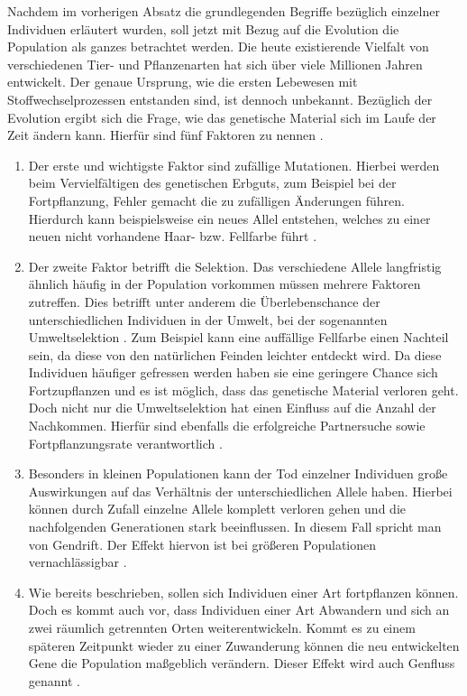 Nachdem im vorherigen Absatz die grundlegenden Begriffe bezüglich einzelner Individuen erläutert wurden, soll jetzt mit Bezug auf die Evolution die Population als ganzes betrachtet werden. Die heute existierende Vielfalt von verschiedenen Tier- und Pflanzenarten hat sich über viele Millionen Jahren entwickelt. Der genaue Ursprung, wie die ersten Lebewesen mit Stoffwechselprozessen entstanden sind, ist dennoch unbekannt. Bezüglich der Evolution ergibt sich die Frage, wie das genetische Material sich im Laufe der Zeit ändern kann. Hierfür sind fünf Faktoren zu nennen \cite{weicker2015evolutionare}.
\begin{enumerate}
	\item Der erste und wichtigste Faktor sind zufällige Mutationen. Hierbei werden beim Vervielfältigen des genetischen Erbguts, zum Beispiel bei der Fortpflanzung, Fehler gemacht die zu zufälligen Änderungen führen. Hierdurch kann beispielsweise ein neues Allel entstehen, welches zu einer neuen nicht vorhandene Haar- bzw. Fellfarbe führt \cite{weicker2015evolutionare}. 
	
	\item Der zweite Faktor betrifft die Selektion. Das verschiedene Allele langfristig ähnlich häufig in der Population vorkommen müssen mehrere Faktoren zutreffen. Dies betrifft unter anderem die Überlebenschance der unterschiedlichen Individuen in der Umwelt, bei der sogenannten Umweltselektion \cite{weicker2015evolutionare}. Zum Beispiel kann eine auffällige Fellfarbe einen Nachteil sein, da diese von den natürlichen Feinden leichter entdeckt wird. Da diese Individuen häufiger gefressen werden haben sie eine geringere Chance sich Fortzupflanzen und es ist möglich, dass das genetische Material verloren geht. Doch nicht nur die Umweltselektion hat einen Einfluss auf die Anzahl der Nachkommen. Hierfür sind ebenfalls die erfolgreiche Partnersuche sowie Fortpflanzungsrate verantwortlich \cite{weicker2015evolutionare}.
	
	\item Besonders in kleinen Populationen kann der Tod einzelner Individuen große Auswirkungen auf das Verhältnis der unterschiedlichen Allele haben. Hierbei können durch Zufall einzelne Allele komplett verloren gehen und die nachfolgenden Generationen stark beeinflussen. In diesem Fall spricht man von Gendrift. Der Effekt hiervon ist bei größeren Populationen vernachlässigbar \cite{weicker2015evolutionare}.
	
	\item Wie bereits beschrieben, sollen sich Individuen einer Art fortpflanzen können. Doch es kommt auch vor, dass Individuen einer Art Abwandern und sich an zwei räumlich getrennten Orten weiterentwickeln. Kommt es zu einem späteren Zeitpunkt wieder zu einer Zuwanderung können die neu entwickelten Gene die Population maßgeblich verändern. Dieser Effekt wird auch Genfluss genannt \cite{weicker2015evolutionare}.
	

\end{enumerate}
